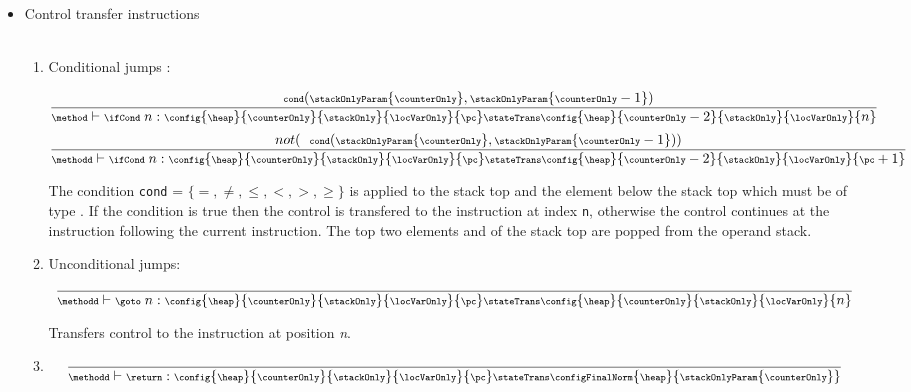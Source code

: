\begin{itemize}
       \item Control transfer instructions \\\\

        \begin{enumerate}
            \item Conditional jumps : \ifCond


        $$ 
           {\scriptsize \frac{ \mbox{ \rm \texttt{ cond}}( \stackOnlyParam{\counterOnly}, \stackOnlyParam{\counterOnly - 1}) } 			       		               
                      {\method \vdash \ifCond \ n : \config{\heap }{\counterOnly}{\stackOnly}{\locVarOnly}{\pc}
		                      \stateTrans 
				      \config{\heap}{\counterOnly - 2}{\stackOnly}{\locVarOnly}{n}} 
            }    $$
		$$ {\scriptsize
                 \frac{  not (\mbox{ \rm \texttt{ cond}}( \stackOnlyParam{\counterOnly}, \stackOnlyParam{\counterOnly - 1})) }		                             
                     {\methodd \vdash \ifCond \ n : \config{\heap}{\counterOnly}{\stackOnly}{\locVarOnly}{\pc} 
		                    \stateTrans 
                                    \config{\heap}{\counterOnly - 2}{\stackOnly}{\locVarOnly}{\pc + 1}} }
           $$
            

	    The condition \texttt{cond} = $\{ =, \neq, \le, <, >, \ge \} $ is applied to the stack top  \stackOnlyParam{\counterOnly} and the element below the stack top
	     which must be of type \Myint. If the condition is true then the control is transfered to the instruction
	    at index \texttt{n}, otherwise the control continues at the instruction following the current instruction. The top two elements \stackOnlyParam{\counterOnly} and
              of the stack top are popped from the operand stack.
 
        \item Unconditional jumps: \goto \\
            $${\scriptsize \frac{  }
	            {\methodd \vdash \goto \ n: \config{\heap}{\counterOnly}{\stackOnly}{\locVarOnly}{\pc} 
		                    \stateTrans 
                                    \config{\heap}{\counterOnly}{\stackOnly}{\locVarOnly}{ n}} }$$
				    
   
             Transfers control to the instruction at position \textit{n}.


      \item \return
        $$ {\scriptsize \frac{ } 
            {\methodd \vdash \return :\config{\heap}{\counterOnly}{\stackOnly}{\locVarOnly}{\pc} 
		                    \stateTrans 
                                    \configFinalNorm{\heap}{\stackOnlyParam{\counterOnly}}}   }  $$


\end{enumerate}
\end{itemize}

